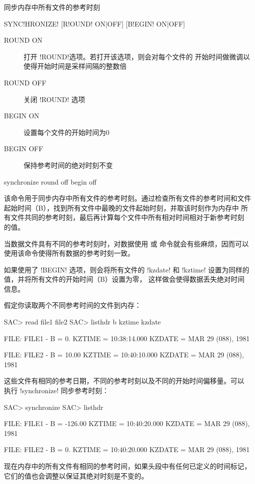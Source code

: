 \label{cmd:synchronize}

同步内存中所有文件的参考时刻

\begin{SACSTX}
SYNC!HRONIZE! [R!OUND! ON|OFF] [B!EGIN! ON|OFF]
\end{SACSTX}

\begin{description}
\item [ROUND ON] 打开 !ROUND!选项。若打开该选项，则会对每个文件的
    开始时间做微调以使得开始时间是采样间隔的整数倍
\item [ROUND OFF] 关闭 !ROUND! 选项
\item [BEGIN ON] 设置每个文件的开始时间为0
\item [BEGIN OFF] 保持参考时间的绝对时刻不变
\end{description}

\begin{SACDFT}
synchronize round off begin off
\end{SACDFT}

该命令用于同步内存中所有文件的参考时刻。通过检查所有文件的参考时间和文件
起始时间（B），找到所有文件中最晚的文件起始时刻，并取该时刻作为内存中
所有文件共同的参考时刻，最后再计算每个文件中所有相对时间相对于新参考时刻
的值。

当数据文件具有不同的参考时刻时，对数据使用  或 
命令就会有些麻烦，因而可以使用该命令使得所有数据的参考时刻一致。

如果使用了 !BEGIN! 选项，则会将所有文件的 !kzdate! 和
!kztime! 设置为同样的值，并将所有文件的开始时间（B）设置为零，
这样做会使得数据丢失绝对时间信息。

假定你读取两个不同参考时间的文件到内存：
\begin{SACCode}
SAC> read file1 file2
SAC> listhdr b kztime kzdate

  FILE: FILE1
  -
  B = 0.
  KZTIME = 10:38:14.000
  KZDATE = MAR 29 (088), 1981

  FILE: FILE2
  -
  B = 10.00
  KZTIME = 10:40:10.000
  KZDATE = MAR 29 (088), 1981
\end{SACCode}

这些文件有相同的参考日期，不同的参考时刻以及不同的开始时间偏移量。可以
执行 !synchronize! 同步参考时刻：
\begin{SACCode}
SAC> synchronize
SAC> listhdr

  FILE: FILE1
  -
  B = -126.00
  KZTIME = 10:40:20.000
  KZDATE = MAR 29 (088), 1981

  FILE: FILE2
  -
  B = 0.
  KZTIME = 10:40:20.000
  KZDATE = MAR 29 (088), 1981
\end{SACCode}
现在内存中的所有文件有相同的参考时间，如果头段中有任何已定义的时间标记，
它们的值也会调整以保证其绝对时刻是不变的。
